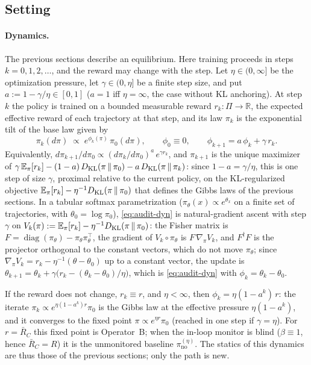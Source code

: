 \subsection{Setting}

\paragraph{Dynamics.} The previous sections describe an equilibrium. Here
training proceeds in steps $k=0,1,2,\dots$, and the reward may change with the
step. Let $\eta\in(0,\infty]$ be the optimization pressure, let
$\gamma\in(0,\eta]$ be a finite step size, and put
$a:=1-\gamma/\eta\in[0,1]$ ($a=1$ iff $\eta=\infty$, the case without KL
anchoring). At step $k$ the policy is trained on a bounded measurable reward
$r_k:\Pi\to\mathbb R$, the expected effective reward of each trajectory at
that step, and its law $\pi_k$ is the exponential tilt of the base law given
by
\begin{equation}\label{eq:audit-dyn}
  \pi_k(d\pi)\;\propto\;e^{\phi_k(\pi)}\,\pi_0(d\pi),\qquad
  \phi_0\equiv0,\qquad \phi_{k+1}=a\,\phi_k+\gamma\,r_k .
\end{equation}
Equivalently, $d\pi_{k+1}/d\pi_0\propto(d\pi_k/d\pi_0)^{a}\,e^{\gamma r_k}$,
and $\pi_{k+1}$ is the unique maximizer of
$\gamma\,\mathbb{E}_{\pi}[r_k]-(1-a)\,D_{\mathrm{KL}}(\pi\,\|\,\pi_0)-a\,D_{\mathrm{KL}}(\pi\,\|\,\pi_k)$:
since $1-a=\gamma/\eta$, this is one step of size $\gamma$, proximal relative
to the current policy, on the KL-regularized objective
$\mathbb{E}_{\pi}[r_k]-\eta^{-1}D_{\mathrm{KL}}(\pi\,\|\,\pi_0)$ that defines the Gibbs laws of
the previous sections. In a tabular softmax parametrization
($\pi_\theta(x)\propto e^{\theta_x}$ on a finite set of trajectories, with
$\theta_0=\log\pi_0$), \eqref{eq:audit-dyn} is natural-gradient ascent with
step $\gamma$ on $V_k(\pi):=\mathbb{E}_{\pi}[r_k]-\eta^{-1}D_{\mathrm{KL}}(\pi\,\|\,\pi_0)$: the
Fisher matrix is
$F=\operatorname{diag}(\pi_\theta)-\pi_\theta\pi_\theta^{\top}$, the gradient
of $V_k\circ\pi_\theta$ is $F\,\nabla_\pi V_k$, and $F^{\dagger}F$ is the
projector orthogonal to the constant vectors, which do not move $\pi_\theta$;
since $\nabla_\pi V_k=r_k-\eta^{-1}(\theta-\theta_0)$ up to a constant vector,
the update is
$\theta_{k+1}=\theta_k+\gamma\bigl(r_k-(\theta_k-\theta_0)/\eta\bigr)$, which
is \eqref{eq:audit-dyn} with $\phi_k=\theta_k-\theta_0$.

If the reward does not change, $r_k\equiv r$, and $\eta<\infty$, then
$\phi_k=\eta(1-a^k)\,r$: the iterate $\pi_k\propto e^{\eta(1-a^k)r}\pi_0$ is
the Gibbs law at the effective pressure $\eta(1-a^k)$, and it converges to the
fixed point $\pi\propto e^{\eta r}\pi_0$ (reached in one step if
$\gamma=\eta$). For $r=\bar R_C$ this fixed point is Operator~B; when the
in-loop monitor is blind ($\beta\equiv1$, hence $\bar R_C=R$) it is the
unmonitored baseline $\pi_{\mathrm{no}}^{(\eta)}$. The statics of this
dynamics are thus those of the previous sections; only the path is new.

